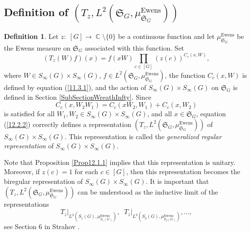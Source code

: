 \documentclass[12pt]{amsart}
\theoremstyle{definition}
\newtheorem{defn}[thm]{Definition}
\numberwithin{equation}{section}
\DeclareMathOperator{\C}{\mathbb{C}}
\DeclareMathOperator{\Ewens}{Ewens}
\begin{document}
\subsection{Definition of $\left(T_z, L^2\left(\mathfrak{S}_G,\mu^{\Ewens}_{\mathfrak{S}_G}\right)\right)$}
\begin{defn}\label{12.2.1}
Let $z:\;[G]\longrightarrow\C\setminus\{0\}$ be a continuous function and let $
\mu^{\Ewens}_{\mathfrak{S}_G}$ be the Ewens measure on $\mathfrak{S}_G$ associated with this function. Set
\begin{equation}\label{12.2.2}
\left(T_z\left(W\right)f\right)(x)=f(xW)\prod\limits_{c\in[G]}\left(z(c)\right)^{C_c(x,W)},
\end{equation}
where $W\in S_{\infty}(G)\times S_{\infty}(G)$, $f\in L^2\left(\mathfrak{S}_G,\mu_{\mathfrak{S}_G}^{\Ewens}\right)$, the function $C_c(x,W)$ is defined by equation (\ref{11.3.1}),
and the action of $S_{\infty}(G)\times S_{\infty}(G)$ on $\mathfrak{S}_G$ is defined in Section \ref{SubSectionWreathInfty}. Since
\begin{equation}\label{12.3.1}
C_c\left(x,W_2W_1\right)=C_c\left(xW_2,W_1\right)+C_c\left(x,W_2\right)
\end{equation}
is satisfied for all $W_1, W_2\in S_{\infty}(G)\times S_{\infty}(G)$, and all $x\in\mathfrak{S}_G$,  equation (\ref{12.2.2}) correctly defines a representation
$\left(T_z, L^2\left(\mathfrak{S}_G,\mu^{\Ewens}_{\mathfrak{S}_G}\right)\right)$
of $S_{\infty}(G)\times S_{\infty}(G)$. This representation is called the \textit{generalized regular representation} of $S_{\infty}(G)\times S_{\infty}(G)$.
\end{defn}
Note that Proposition \ref{Prop12.1.1} implies that this representation is unitary. Moreover, if $z(c)=1$ for each $c\in [G]$, then this representation becomes the biregular representation of $S_{\infty}(G)\times S_{\infty}(G)$.
It is important that $\left(T_z, L^2\left(\mathfrak{S}_G,\mu^{\Ewens}_{\mathfrak{S}_G}\right)\right)$ can be understood as the inductive limit of the representations
\begin{equation}\label{InductiveSequence}
T_z\biggr|_{L^2\left(S_1(G),\mu^{\Ewens}_{S_1(G)}\right)},\;\;
T_z\biggr|_{L^2\left(S_2(G),\mu^{\Ewens}_{S_2(G)}\right)},\ldots,
\end{equation}
see Section 6 in Strahov \cite{StrahovIsr25}.
\end{document}
